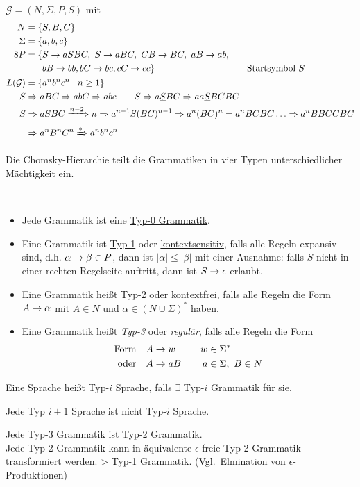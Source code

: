 \begin{Bsp} $\mathcal{G}=(N,\Sigma,P,S)$ mit
	\begin{align*}
		N &= \{S,B,C\}\\
		\Sigma &= \{a,b,c\}\\8
		P &= 
		\begin{aligned}[t]
			 \{ &S \-> aSBC,\ S\->aBC,\ CB\-> BC,\ aB\-> ab,\\
			 &bB\-> bb, bC\-> bc, cC\-> cc \} & \quad\text{Startsymbol }S
		\end{aligned}\\
		L(\mathcal{G}) &=  \{ a^nb^nc^n \mid n\geq 1 \}\\
		S &\=> aBC \=> abC \=> abc \qquad S\=>a\underline{S}BC \=> aa\underline{S}BCBC\\
		S &\=> aSBC \xRightarrow{n-2} n \=> a^{n-1}S(BC)^{n-1} \=> a^n(BC)^n = a^nBCBC \dots \=> a^nBBCCBC\\
		&\=> a^nB^nC^n \xRightarrow* a^nb^nc^n
	\end{align*}
\end{Bsp}
Die Chomsky-Hierarchie teilt die Grammatiken in vier Typen unterschiedlicher Mächtigkeit ein.
\begin{Def}\
	\begin{itemize}
	\item Jede Grammatik ist eine \underline{Typ-0 Grammatik}.
	\item Eine Grammatik ist \underline{Typ-1} oder \underline{kontextsensitiv}, falls alle Regeln expansiv sind, d.h. $\alpha\->\beta\in P$, dann ist $|\alpha|\leq |\beta|$ mit einer Ausnahme: falls $S$ nicht in einer rechten Regelseite auftritt, dann ist $S\->\epsilon$ erlaubt.
	\item Eine Grammatik heißt \underline{Typ-2} oder \underline{kontextfrei}, falls alle Regeln die Form $A\->\alpha$ mit $A\in N$ und $\alpha\in(N\cup\Sigma)^*$ haben.
	\item Eine Grammatik heißt \emph{Typ-3} oder \emph{regulär}, falls alle Regeln die Form
	\begin{alignat*}{2}
		\text{Form}\quad &A\->w &\quad w&\in\Sigma^*\\
		\text{oder}\quad &A\->aB& a&\in\Sigma,\ B\in N
	\end{alignat*}
	\end{itemize}
	Eine Sprache heißt Typ-$i$ Sprache, falls $\exists$ Typ-$i$ Grammatik für sie.
\end{Def}

\begin{Beobachtung}
	Jede Typ $i+1$ Sprache ist nicht Typ-$i$ Sprache.
\end{Beobachtung}
Jede Typ-3 Grammatik ist Typ-2 Grammatik.\\
Jede Typ-2 Grammatik kann in äquivalente $\epsilon$-freie Typ-2 Grammatik transformiert werden. \-> Typ-1 Grammatik. (Vgl.\ Elmination von $\epsilon$-Produktionen)

